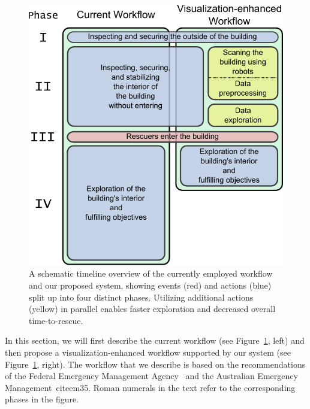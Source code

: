 \documentclass{egpubl}
\begin{document}
\begin{figure}
	\newcommand{\abWorkflowImageHeight}{\columnwidth}
	\centering
	\includegraphics[height=\abWorkflowImageHeight]{figures/workflow.pdf}
	\caption{A schematic timeline overview of the currently employed workflow and our proposed system, showing events (red) and actions (blue) split up into four distinct phases. Utilizing additional actions (yellow) in parallel enables faster exploration and decreased overall time-to-rescue.}
	\label{fig:workflow:workflow}
\end{figure}

In this section, we will first describe the current workflow (see Figure~\ref{fig:workflow:workflow}, left) and then propose a visualization-enhanced workflow supported by our system (see Figure~\ref{fig:workflow:workflow}, right). The workflow that we describe is based on the recommendations of the Federal Emergency Management Agency~\cite{fema08} and the Australian Emergency Management~cite{em35}. Roman numerals in the text refer to the corresponding phases in the figure.
\end{document}
